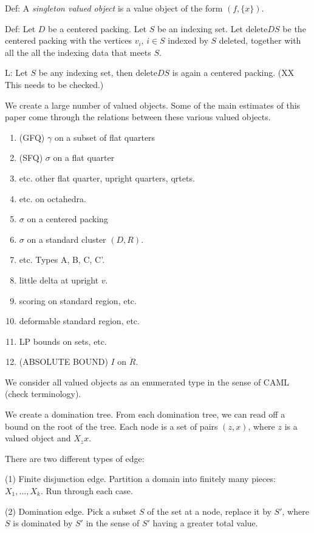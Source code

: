 Def: A {\it singleton valued object} is a value object of the form
$(f,\{x\})$.

Def: Let $D$ be a centered packing.  Let $S$ be an indexing set.
Let $\text{delete} D S$ be the centered packing with the vertices
$v_i$, $i \in S$ indexed by $S$ deleted, together with all the all
the indexing data that meets $S$.

L: Let $S$ be any indexing set, then $\text{delete} D S$ is again
a centered packing. (XX This needs to be checked.)

We create a large number of valued objects.  Some of the main estimates
of this paper come through the relations between these various valued
objects.

\begin{enumerate}
\item (GFQ) $\gamma$ on a subset of flat quarters \item (SFQ)
$\sigma$ on a flat quarter \item etc. other flat quarter, upright
quarters, qrtets. \item etc. on octahedra. \item $\sigma$ on a
centered packing \item $\sigma$ on a standard cluster $(D,R)$.
\item etc. Types A, B, C, C'. \item little delta at upright $v$.
\item scoring on standard region, etc. \item deformable
standard region, etc. \item LP bounds on sets, etc. \item
(ABSOLUTE BOUND) $I$ on $\ring{R}$.
\end{enumerate}

We consider all valued objects as an enumerated type in the sense of CAML
(check terminology).

We create a domination tree.  From each domination tree, we can read off
a bound on the root of the tree.
Each node is a set of pairs $(z,x)$, where $z$ is a valued object and
$X_z x$.

There are two different types of edge:

(1) Finite disjunction edge.
Partition a domain into finitely many pieces: $X_1,\ldots, X_k$.
Run through each case.

(2) Domination edge.  Pick a subset $S$ of the set at a node, replace
it by $S'$, where $S$ is dominated by $S'$ in the sense of $S'$ having
a greater total value.

